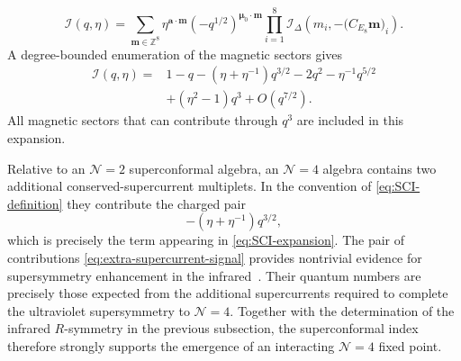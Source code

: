 \documentclass[11pt,a4paper]{article}
\numberwithin{equation}{section}
\begin{document}
\begin{equation}
  \mathcal I(q,\eta)
  =\sum_{\boldsymbol m\in\mathbb Z^8}
  \eta^{\boldsymbol a\cdot\boldsymbol m}
  \left(-q^{1/2}\right)^{\boldsymbol\mu_0\cdot\boldsymbol m}
  \prod_{i=1}^{8}
  \mathcal I_\Delta\!\left(
    m_i,-\bigl(C_{E_8}\boldsymbol m\bigr)_i
  \right).
  \label{eq:full-SCI}
\end{equation}
A degree-bounded enumeration of the magnetic sectors gives
\begin{equation}
\begin{aligned}
  \mathcal I(q,\eta)
  ={}&1-q-(\eta+\eta^{-1})q^{3/2}-2q^2
  -\eta^{-1}q^{5/2}\\
  &+(\eta^2-1)q^3+O(q^{7/2}).
\end{aligned}
  \label{eq:SCI-expansion}
\end{equation}
All magnetic sectors that can contribute through $q^3$ are included in this expansion.

Relative to an $\mathcal N=2$ superconformal algebra, an $\mathcal N=4$ algebra contains two additional conserved-supercurrent multiplets.  In the convention of \eqref{eq:SCI-definition} they contribute the charged pair
\begin{equation}
  -(\eta+\eta^{-1})q^{3/2},
  \label{eq:extra-supercurrent-signal}
\end{equation}
which is precisely the term appearing in \eqref{eq:SCI-expansion}.  The pair of contributions \eqref{eq:extra-supercurrent-signal} provides nontrivial evidence for supersymmetry enhancement in the infrared~\cite{GangKimParkStubbs:2024Nahm}.  Their quantum numbers are precisely those expected from the additional supercurrents required to complete the ultraviolet supersymmetry to $\mathcal N=4$.  Together with the determination of the infrared $R$-symmetry in the previous subsection, the superconformal index therefore strongly supports the emergence of an interacting $\mathcal N=4$ fixed point.
\end{document}
